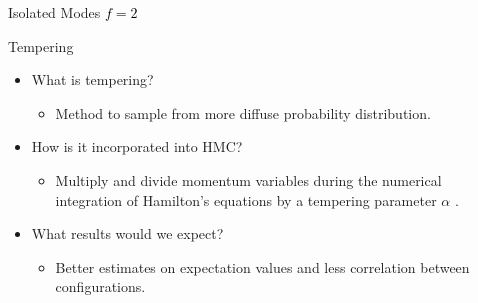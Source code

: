 \documentclass{beamer}
\begin{document}
    \begin{frame}{Isolated Modes \textcolor{black}{$f=2$}}
        \begin{figure}
                    \centering
        \end{figure}
    \end{frame}

    \begin{frame}{Tempering}
    \begin{itemize}
            \item<1-> What is tempering? 
            \begin{itemize}
                \item<1-> Method to sample from more diffuse probability distribution.
            \end{itemize}
            \item<2-> How is it incorporated into HMC?
            \begin{itemize}
                \item<2-> Multiply and divide momentum variables during the numerical integration of Hamilton's equations by a tempering parameter $\alpha$ \cite{neal_2011}.
            \end{itemize}
            \item<3-> What results would we expect?
            \begin{itemize}
                \item<3-> Better estimates on expectation values and less correlation between configurations.
            \end{itemize}
        \end{itemize}
    \end{frame}
\end{document}
